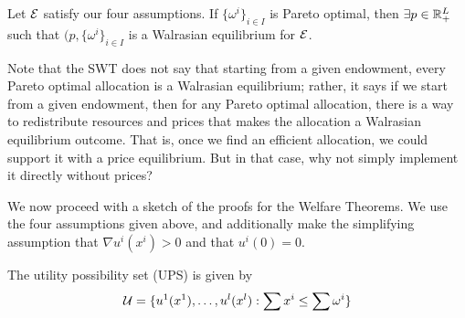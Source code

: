 \begin{theorem}
  Let ${\cal E}$ satisfy our four assumptions. If $\{\omega^i\}_{i \in
    I}$ is Pareto optimal, then $\exists p \in {\mathbb R}^L_+$ such that $(p,
  \{\omega^i\}_{i \in I}$ is a Walrasian equilibrium for ${\cal E}$.
\end{theorem}

Note that the SWT does not say that starting from a given endowment,
every Pareto optimal allocation is a Walrasian equilibrium; rather, it
says if we start from a given endowment, then for any Pareto optimal
allocation, there is a way to redistribute resources and prices that
makes the allocation a Walrasian equilibrium outcome. That is, once we
find an efficient allocation, we could support it with a price
equilibrium. But in that case, why not simply implement it directly
without prices?


We now proceed with a sketch of the proofs for the Welfare
Theorems. We use the four assumptions given above, and additionally
make the simplifying assumption that $\nabla u^i(x^i) > 0$ and that
$u^i(0) = 0$. 

\begin{definition}
  The utility possibility set (UPS) is given by
  \[
  {\cal U} = \{u^1(x^1), \dots, u^l(x^l) : \sum x^i \leq \sum \omega^i \}
  \]
\end{definition}

